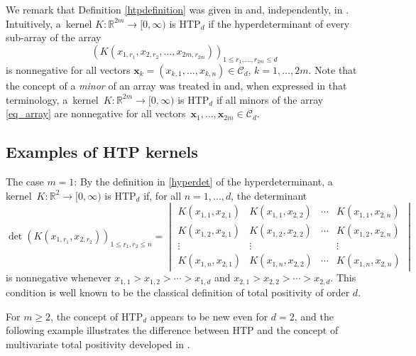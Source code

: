 \documentclass[pdftex]{sigma}
\numberwithin{equation}{section}
\def\R{{\mathbb R}}
\def\CC{\mathcal{C}}
\def\xx{\boldsymbol{x}}
\begin{document}
We remark that Definition \ref{htpdefinition} was given in \cite{Johnson_Richards} and, independently, in \cite{wanglixu}. Intuitively, a~kernel $K\colon\R^{2m} \to [0,\infty)$ is HTP$_d$ if the hyperdeterminant of every sub-array of the array
\begin{equation}
\label{eq_array}
(K(x_{1,r_1},x_{2,r_2},\dots,x_{2m,r_{2m}}))_{1 \le r_1,\dots,r_{2m} \le d}
\end{equation}
is nonnegative for all vectors $\xx_k = (x_{k,1},\dots,x_{k,n}) \in \CC_d$, $k=1,\dots,2m$. Note that the concept of a {\it minor} of an array was treated in \cite{boussicault} and, when expressed in that terminology, a~kernel~${K\colon\R^{2m} \to [0,\infty)}$ is HTP$_d$ if all minors of the array \eqref{eq_array} are nonnegative for all vectors~${\xx_1,\dots,\xx_{2m} \in \CC_d}$.





\subsection{Examples of HTP kernels}

\begin{Example}
\label{classicaltp}
The case $m = 1$: By the definition in \eqref{hyperdet} of the hyperdeterminant, a kernel~${K\colon \R^2 \to [0,\infty)}$ is HTP$_d$ if, for all $n = 1,\dots,d$, the determinant
\[
\det(K(x_{1,r_1},x_{2,r_2}))_{1 \le r_1,r_2 \le n} =
\begin{vmatrix}
K(x_{1,1},x_{2,1}) & K(x_{1,1},x_{2,2}) & \cdots & K(x_{1,1},x_{2,n}) \\
K(x_{1,2},x_{2,1}) & K(x_{1,2},x_{2,2}) & \cdots & K(x_{1,2},x_{2,n}) \\
\vdots & \vdots & & \vdots \\
K(x_{1,n},x_{2,1}) & K(x_{1,n},x_{2,2}) & \cdots & K(x_{1,n},x_{2,n})
\end{vmatrix}
\]
is nonnegative whenever $x_{1,1} > x_{1,2} > \cdots > x_{1,d}$ and $x_{2,1} > x_{2,2} > \cdots > x_{2,d}$. This condition is well known to be the classical definition of total positivity of order $d$.
\end{Example}

For $m \ge 2$, the concept of HTP$_d$ appears to be new even for $d=2$, and the following example illustrates the difference between HTP and the concept of multivariate total positivity developed in \cite{karlinrinott80}.
\end{document}
